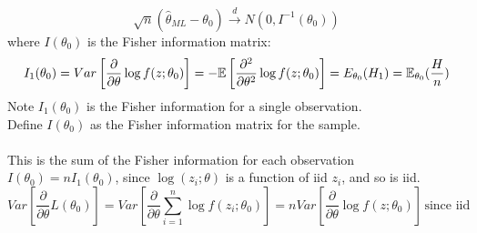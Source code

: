 \documentclass[DIV=14,titlepage=false]{scrreprt}
\begin{document}
\begin{prop}
\[\sqrt{n}(\hat{\theta}_{ML}-\theta_0)\xrightarrow{d}N(0,I^{-1}(\theta_0))\]
where \(I(\theta_0)\) is the Fisher information matrix:
\[I_1(\theta_0)=Var\left[\frac{\partial}{\partial\theta}\log f(z;\theta_0)\right]=-\mathbb{E}\left[\frac{\partial^2}{\partial\theta^2}\log f(z;\theta_0)\right]=E_{\theta_0}(H_1)=\mathbb{E}_{\theta_0}(\frac{H}{n})\]
Note \(I_1(\theta_0)\) is the Fisher information for a single observation.
\\ Define \(I(\theta_0)\) as the Fisher information matrix for the sample. 
\\ \\ This is the sum of the Fisher information for each observation \(I(\theta_0)=nI_1(\theta_0)\), since \(\log(z_i;\theta)\) is a function of iid \(z_i\), and so is iid.
\[Var\left[\frac{\partial}{\partial\theta}L(\theta_0)\right]=Var\left[\frac{\partial}{\partial\theta}\sum_{i=1}^n\log f(z_i;\theta_0)\right]=n Var\left[\frac{\partial}{\partial\theta}\log f(z;\theta_0)\right] \,\text{since iid}\]
\end{prop}
\vspace{5mm}
\end{document}
